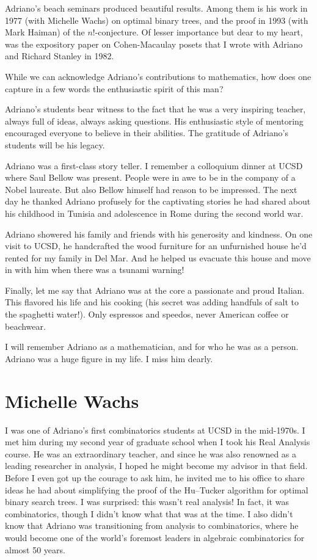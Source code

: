 \documentclass{notices}
\begin{document}
Adriano's beach seminars produced beautiful results. Among them is his work in 1977 (with Michelle Wachs) on optimal binary trees, and the proof in 1993 (with Mark Haiman) of the $n!$-conjecture. Of lesser importance but dear to my heart, was the expository paper on Cohen-Macaulay posets that I wrote with Adriano and Richard Stanley in 1982. 
 
While we can acknowledge Adriano's contributions to mathematics, how does one capture in a few words the enthusiastic spirit of this man?
 
Adriano's students bear witness to the fact that he was a very inspiring teacher, always full of ideas, always asking questions.  His enthusiastic style of mentoring encouraged everyone to believe in their abilities. The gratitude of Adriano's students will be his legacy.
 
Adriano was a first-class story teller. I remember a colloquium dinner at UCSD where Saul Bellow was present. People were in awe to be in the company of a Nobel laureate. But also Bellow himself had reason to be impressed.  The next day he thanked Adriano profusely for the captivating stories he had shared about his childhood in Tunisia and adolescence in Rome during the second world war.
 
Adriano showered his family and friends with his generosity and kindness. On one visit to UCSD, he handcrafted the wood furniture for an unfurnished house he'd rented for my family in Del Mar. And he helped us evacuate this house and move in with him when there was a tsunami warning! 
 
Finally, let me say that Adriano was at the core a passionate and proud Italian. This flavored his life and his cooking (his secret was adding handfuls of salt to the spaghetti water!).  Only espressos and speedos, never American coffee or beachwear.
 
I will remember Adriano as a mathematician, and for who he was as a person. Adriano was a huge figure in my life. I miss him dearly.


\section*{Michelle Wachs}
I was one of Adriano's first combinatorics students at UCSD in the mid-1970s. I met him during my second year of graduate school when I took his Real Analysis course. He was an extraordinary teacher, and since he was also renowned as a leading researcher in analysis, I hoped he might become my advisor in that field.  Before I even got up the courage to ask him, he invited me to his office to share  ideas he had about simplifying the proof of the 
Hu--Tucker algorithm for optimal binary search trees. I was surprised: this wasn't real analysis! In fact, it was combinatorics, though I didn't know what that was at the time. I also didn't know that Adriano was transitioning from analysis to combinatorics, where he would become one of the world's foremost leaders in algebraic combinatorics for almost 50 years.
\end{document}

